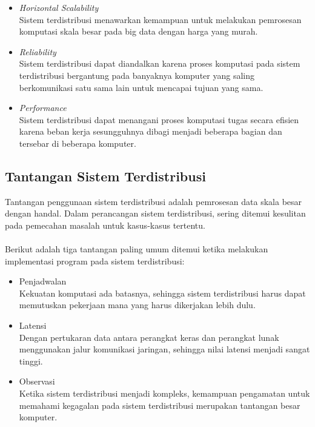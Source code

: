 \begin{itemize}
\item \textit{Horizontal Scalability}\\
Sistem terdistribusi menawarkan kemampuan untuk melakukan pemrosesan komputasi skala besar pada big data dengan harga yang murah.

\item \textit{Reliability}\\
Sistem terdistribusi dapat diandalkan karena proses komputasi pada sistem terdistribusi bergantung pada banyaknya komputer yang saling berkomunikasi satu sama lain untuk mencapai tujuan yang sama.
 
\item \textit{Performance}\\
Sistem terdistribusi dapat menangani proses komputasi tugas secara efisien karena beban kerja sesungguhnya dibagi menjadi beberapa bagian dan tersebar di beberapa komputer. 
\end{itemize}

\subsection{Tantangan Sistem Terdistribusi} 
Tantangan penggunaan sistem terdistribusi adalah pemrosesan data skala besar dengan handal. Dalam perancangan sistem terdistribusi, sering ditemui kesulitan pada pemecahan masalah untuk kasus-kasus tertentu. 
\\\\
Berikut adalah tiga tantangan paling umum ditemui ketika melakukan implementasi program pada sistem terdistribusi:

\begin{itemize}
\item Penjadwalan\\
Kekuatan komputasi ada batasnya, sehingga sistem terdistribusi harus dapat memutuskan pekerjaan mana yang harus dikerjakan lebih dulu.
\item Latensi\\
Dengan pertukaran data antara perangkat keras dan perangkat lunak menggunakan jalur komunikasi jaringan, sehingga nilai latensi menjadi sangat tinggi. 
\item Observasi\\
Ketika sistem terdistribusi menjadi kompleks, kemampuan pengamatan untuk memahami kegagalan pada sistem terdistribusi merupakan tantangan besar komputer. 
\end{itemize}

